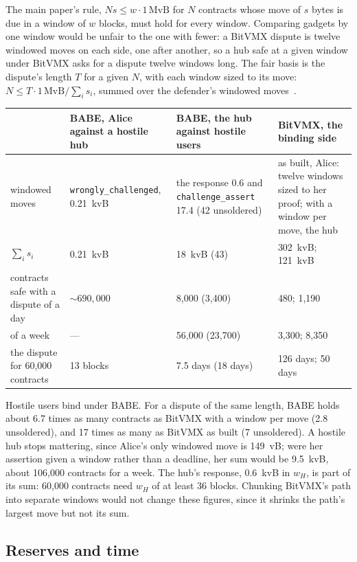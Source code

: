 \documentclass[11pt]{article}
\newcommand{\tx}[1]{\texttt{#1}}
\begin{document}
The main paper's rule, $N s \le w \cdot 1\,\mathrm{MvB}$ for $N$
contracts whose move of $s$ bytes is due in a window of $w$ blocks, must
hold for every window. Comparing gadgets by one window would be unfair
to the one with fewer: a BitVMX dispute is twelve windowed moves on each
side, one after another, so a hub safe at a given window under BitVMX
asks for a dispute twelve windows long. The fair basis is the dispute's
length $T$ for a given $N$, with each window sized to its move:
$N \le T \cdot 1\,\mathrm{MvB} / \sum_i s_i$, summed over the defender's
windowed moves~\cite[\S 9]{lichenbitvmx}.
\begin{center}
\small
\begin{tabularx}{\linewidth}{>{\raggedright\arraybackslash}p{34mm}LLL}
\toprule
& BABE, Alice against a hostile hub & BABE, the hub against hostile users & BitVMX, the binding side \\
\midrule
windowed moves & \tx{wrongly\_challenged}, 0.21~kvB & the response 0.6 and \tx{challenge\_assert} 17.4 (42 unsoldered) & as built, Alice: twelve windows sized to her proof; with a window per move, the hub \\
$\sum_i s_i$ & 0.21~kvB & 18~kvB (43) & 302~kvB; 121~kvB \\
contracts safe with a dispute of a day & ${\sim}690{,}000$ & 8,000 (3,400) & 480; 1,190 \\
of a week & --- & 56,000 (23,700) & 3,300; 8,350 \\
the dispute for 60,000 contracts & 13 blocks & 7.5 days (18 days) & 126 days; 50 days \\
\bottomrule
\end{tabularx}
\end{center}
Hostile users bind under BABE. For a dispute of the same length, BABE
holds about 6.7 times as many contracts as BitVMX with a window per move
(2.8 unsoldered), and 17 times as many as BitVMX as built (7 unsoldered).
A hostile hub stops mattering, since Alice's only windowed move is
149~vB; were her assertion given a window rather than a deadline, her
sum would be 9.5~kvB, about 106,000 contracts for a week. The hub's
response, 0.6~kvB in $w_H$, is part of its sum: 60,000 contracts need
$w_H$ of at least 36 blocks. Chunking BitVMX's path into separate windows
would not change these figures, since it shrinks the path's largest move
but not its sum.

\subsection{Reserves and time}
\end{document}
